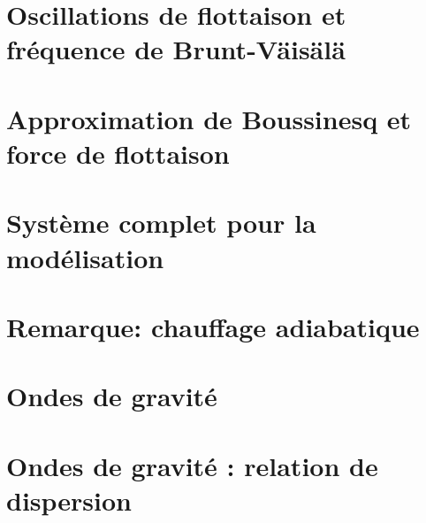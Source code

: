 \documentclass[a4paper,DIV16,10pt]{scrartcl}
\begin{document}
\newpage
\section{Oscillations de flottaison et fréquence de Brunt-V{\"a}is{\"a}l{\"a}}


\newpage
\section{Approximation de Boussinesq et force de flottaison}


\newpage
\section{Système complet pour la modélisation}

\section{Remarque: chauffage adiabatique}


\newpage
\section{Ondes de gravité}


\newpage
\section{Ondes de gravité : relation de dispersion}

\end{document}
